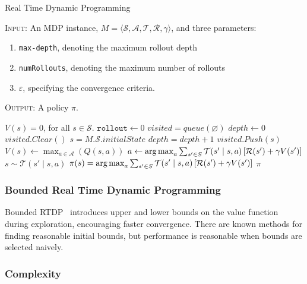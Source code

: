 \documentclass[11pt]{article}
\begin{document}
\begin{algorithm}[t]
\caption{Real Time Dynamic Programming}\label{alg:rtdp}
\textsc{Input:} An MDP instance, $M = \langle \mathcal{S}, \mathcal{A}, \mathcal{T}, \mathcal{R}, \gamma \rangle$, and three parameters: 
\begin{enumerate}
\item \texttt{max-depth}, denoting the maximum rollout depth
\item \texttt{numRollouts}, denoting the maximum number of rollouts
\item $\varepsilon$, specifying the convergence criteria.
\end{enumerate}
\textsc{Output:} A policy $\pi$.
\begin{algorithmic}[1]
\State $V(s) = 0$, for all $s \in \mathcal{S}$.
\State $\texttt{rollout} \gets 0$
\State $visited = queue(\varnothing)$
\State $depth \gets 0$
\State $visited.Clear()$
\State $s = M.\mathcal{S}.initialState$
\State $depth = depth + 1$
\State $visited.Push(s)$
\State $V(s) \gets \max_{a \in \mathcal{A}} (Q(s,a))$
\State $a \gets \operatorname*{arg\,max}_a \sum_{s' \in S} \mathcal{T}(s' \mid s, a) \left[\mathcal{R}(s') + \gamma V(s') \right]$
\State $s \sim \mathcal{T}(s' \mid s,a)$
\EndWhile
\EndWhile
{}
\State $\pi(s) = \operatorname*{arg\,max}_a \sum_{s' \in S} \mathcal{T}(s' \mid s, a) \left[\mathcal{R}(s') + \gamma V(s') \right]$
\EndFor
{} $\pi$
\end{algorithmic}
\label{alg:rtdp}
\end{algorithm}

\subsubsection{Bounded Real Time Dynamic Programming}

Bounded RTDP~\cite{mcmahan2005bounded} introduces upper and lower bounds on the value function during exploration, encouraging faster convergence. There are known methods for finding reasonable initial bounds, but performance is reasonable when bounds are selected naively. 




\subsubsection{Complexity}
\end{document}
